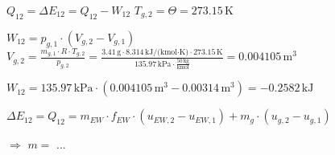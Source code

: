 \( Q_{12} = \Delta E_{12} = Q_{12} - W_{12} \)  
\( T_{g,2} = \Theta = 273.15 \, \text{K} \)  

\( W_{12} = p_{g,1} \cdot (V_{g,2} - V_{g,1}) \)  
\( V_{g,2} = \frac{m_{g,1} \cdot R \cdot T_{g,2}}{p_{g,2}} = \frac{3.41 \, \text{g} \cdot 8.314 \, \text{kJ/(kmol·K)} \cdot 273.15 \, \text{K}}{135.97 \, \text{kPa} \cdot \frac{50 \, \text{kg}}{\text{kmol}}} = 0.004105 \, \text{m}^3 \)  

\( W_{12} = 135.97 \, \text{kPa} \cdot (0.004105 \, \text{m}^3 - 0.00314 \, \text{m}^3) = -0.2582 \, \text{kJ} \)  

\( \Delta E_{12} = Q_{12} = m_{EW} \cdot f_{EW} \cdot (u_{EW,2} - u_{EW,1}) + m_{g} \cdot (u_{g,2} - u_{g,1}) \)  

\( \Rightarrow \) \( m = \) ...